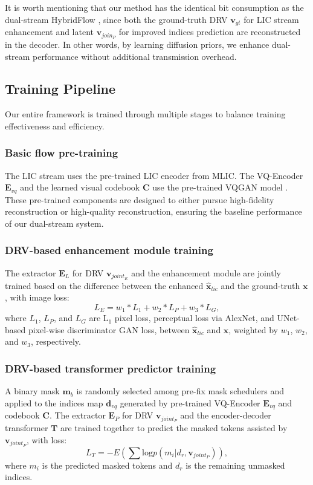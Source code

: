 It is worth mentioning that our method has the identical bit consumption as the dual-stream HybridFlow \cite{lu2024hybridflow}, since both the ground-truth DRV $\textbf{v}_{gt}$ for LIC stream enhancement and latent $\textbf{v}_{join_{P}}$ for improved indices prediction are reconstructed in the decoder. In other words, by learning diffusion priors, we enhance dual-stream performance without additional transmission overhead. 

\subsection{Training Pipeline} 
Our entire framework is trained through multiple stages to balance training effectiveness and efficiency. 

\subsubsection{Basic flow pre-training} 
The LIC stream uses the pre-trained LIC encoder from MLIC. The VQ-Encoder $\textbf{E}_{vq}$ and the learned visual codebook $\textbf{C}$ use the pre-trained VQGAN model \cite{esser2021taming}. These pre-trained components are designed to either pursue high-fidelity reconstruction or high-quality reconstruction, ensuring the baseline performance of our dual-stream system.

\subsubsection{DRV-based enhancement module training} 
The extractor $\textbf{E}_{L}$ for DRV $\textbf{v}_{joint_{E}}$ and the enhancement module are jointly trained based on the difference between the enhanced $\hat{\textbf{x}}_{lic}$ and the ground-truth $\textbf{x}$, with image loss:
\begin{equation}
    \label{eq: imageloss}
        L_{E} \!=\!w_{1} \!*\!L_{1} \!+\!w_{2}\!*\!L_{P}
        + w_{3}\!*\!L_{G},
\end{equation}
where $L_{1}$, $L_{P}$, and $L_{G}$ are L$_{1}$ pixel loss, perceptual loss via AlexNet, and UNet-based pixel-wise discriminator GAN loss, between ${\hat{\textbf{x}}}_{lic}$ and $\textbf{x}$, weighted by $w_1$, $w_2$, and $w_3$, respectively.
\subsubsection{DRV-based transformer predictor training} 
A binary mask $\textbf{m}_{b}$ is randomly selected among pre-fix mask schedulers and applied to the indices map $\textbf{d}_{vq}$ generated by pre-trained VQ-Encoder $\mathbf{E}_{vq}$  and codebook $\mathbf{C}$. The extractor $\textbf{E}_{P}$ for DRV $\textbf{v}_{joint_{P}}$ and the encoder-decoder transformer $\textbf{T}$ are trained together to predict the masked tokens assisted by $\textbf{v}_{joint_{P}}$, with loss:
\begin{equation}
\label{eq:tokenlogitloss}
L_{T}= -E(\sum \mathrm{log} p(m_{i}|d_{r}, \textbf{v}_{joint_{P}})),
\end{equation}
where $m_{i}$ is the predicted masked tokens and $d_{r}$ is the remaining unmasked indices.
